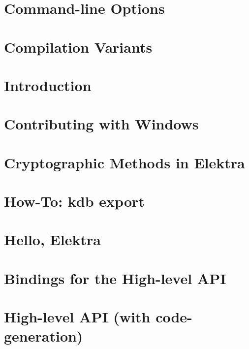 \let\mypdfximage\pdfximage\def\pdfximage{\immediate\mypdfximage}\documentclass[twoside]{book}
\newcommand{\+}{\discretionary{\mbox{\scriptsize$\hookleftarrow$}}{}{}}
\begin{document}
\chapter{Command-\/line Options}
\label{doc_tutorials_command-line-options_md}

\chapter{Compilation Variants}
\label{doc_tutorials_compilation-variants_md}

\chapter{Introduction}
\label{doc_tutorials_contributing-clion_md}

\chapter{Contributing with Windows}
\label{doc_tutorials_contributing-windows_md}

\chapter{Cryptographic Methods in Elektra}
\label{doc_tutorials_crypto_md}

\chapter{How-\/\+To\+: kdb export}
\label{doc_tutorials_export_md}

\chapter{Hello, Elektra}
\label{doc_tutorials_hello-elektra_md}

\chapter{Bindings for the High-\/level API}
\label{doc_tutorials_highlevel-bindings_md}

\chapter{High-\/level API (with code-\/generation)}
\label{doc_tutorials_highlevel_md}

\end{document}
